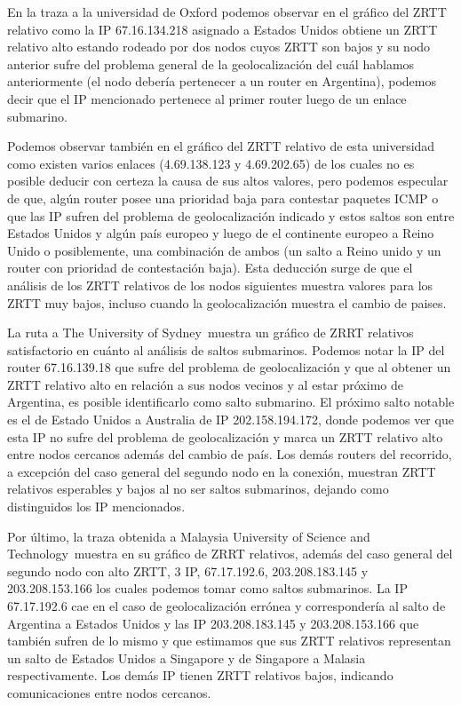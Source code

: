 \documentclass[a4paper, 10pt, twoside]{article}
\newcommand{\sydney}{The University of Sydney}
\newcommand{\must}{Malaysia University of Science and Technology}
\begin{document}
En la traza a la universidad de Oxford podemos observar en el gráfico del ZRTT relativo como la IP 67.16.134.218 asignado a Estados Unidos obtiene un ZRTT relativo alto estando rodeado por dos nodos cuyos ZRTT son bajos y su nodo anterior sufre del problema general de la geolocalización del cuál hablamos anteriormente (el nodo debería pertenecer a un router en Argentina), podemos decir que el IP mencionado pertenece al primer router luego de un enlace submarino.
 
Podemos observar también en el gráfico del ZRTT relativo de esta universidad como existen varios enlaces (4.69.138.123 y 4.69.202.65) de los cuales no es posible deducir con certeza la causa de sus altos valores, pero podemos especular de que, algún router posee una prioridad baja para contestar paquetes ICMP o que las IP sufren del problema de geolocalización indicado y estos saltos son entre Estados Unidos y algún país europeo y luego de el continente europeo a Reino Unido o posiblemente, una combinación de ambos (un salto a Reino unido y un router con prioridad de contestación baja). Esta deducción surge de que el análisis de los ZRTT relativos de los nodos siguientes muestra valores para los ZRTT muy bajos, incluso cuando la geolocalización muestra el cambio de paises.
 
La ruta a \sydney \ muestra un gráfico de ZRRT relativos satisfactorio en cuánto al análisis de saltos submarinos. Podemos notar la IP del router 67.16.139.18 que sufre del problema de geolocalización y que al obtener un ZRTT relativo alto en relación a sus nodos vecinos y al estar próximo de Argentina, es posible identificarlo como salto submarino. El próximo salto notable es el de Estado Unidos a Australia de IP 202.158.194.172, donde podemos ver que esta IP no sufre del problema de geolocalización y marca un ZRTT relativo alto entre nodos cercanos además del cambio de país. Los demás routers del recorrido, a excepción del caso general del segundo nodo en la conexión, muestran ZRTT relativos esperables y bajos al no ser saltos submarinos, dejando como distinguidos los IP mencionados.
 
Por último, la traza obtenida a \must \ muestra en su gráfico de ZRRT relativos, además del caso general del segundo nodo con alto ZRTT, 3 IP, 67.17.192.6, 203.208.183.145 y 203.208.153.166 los cuales podemos tomar como saltos submarinos. La IP 67.17.192.6 cae en el caso de geolocalización errónea y correspondería al salto de Argentina a Estados Unidos y las IP 203.208.183.145 y 203.208.153.166 que también sufren de lo mismo y que estimamos que sus ZRTT relativos representan un salto de Estados Unidos a Singapore y de Singapore a Malasia respectivamente. Los demás IP tienen ZRTT relativos bajos, indicando comunicaciones entre nodos cercanos.
\end{document}
